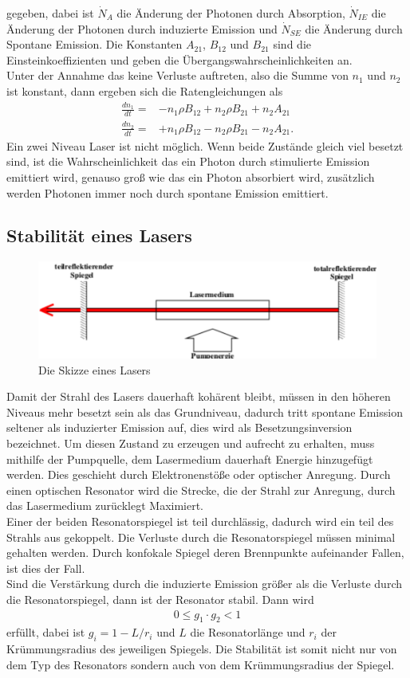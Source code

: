gegeben, dabei ist $\dot{N}_A$ die Änderung der Photonen durch Absorption, $\dot{N}_{IE}$ die Änderung der Photonen durch induzierte Emission und $\dot{N}_{SE}$ die Änderung durch Spontane Emission. Die Konstanten $A_{21}$, $B_{12}$ und $B_{21}$ sind die Einsteinkoeffizienten und geben die Übergangswahrscheinlichkeiten an.\\
Unter der Annahme das keine Verluste auftreten, also die Summe von $n_1$ und $n_2$ ist konstant, dann ergeben sich die Ratengleichungen als
\begin{align*}
\frac{dn_1}{dt}=&-n_1 \rho B_{12} + n_2\rho B_{21} + n_2 A_{21}\\
\frac{dn_2}{dt}=&+n_1\rho B_{12} - n_2\rho B_{21} -n_2A_{21}.
\end{align*}
Ein zwei Niveau Laser ist nicht möglich. Wenn beide Zustände gleich viel besetzt sind, ist die Wahrscheinlichkeit das ein Photon durch stimulierte Emission emittiert wird, genauso groß wie das ein Photon absorbiert wird, zusätzlich werden Photonen immer noch durch spontane Emission emittiert.
\subsection{Stabilität eines Lasers}
\begin{figure}[h!]
\centering
\includegraphics[scale=0.75]{../Grafiken/Laser.pdf}
\caption{Die Skizze eines Lasers\cite{V61}}\label{SkizzeLaser}
\end{figure}
Damit der Strahl des Lasers dauerhaft kohärent bleibt, müssen in den höheren Niveaus mehr besetzt sein als das Grundniveau, dadurch tritt spontane Emission seltener als induzierter Emission auf, dies wird als Besetzungsinversion bezeichnet. Um diesen Zustand zu erzeugen und aufrecht zu erhalten, muss mithilfe der Pumpquelle, dem Lasermedium dauerhaft Energie hinzugefügt werden. Dies geschieht durch Elektronenstöße oder optischer Anregung. Durch einen optischen Resonator wird die Strecke, die der Strahl zur Anregung, durch das Lasermedium zurücklegt Maximiert.\\
Einer der beiden Resonatorspiegel ist teil durchlässig, dadurch wird ein teil des Strahls aus gekoppelt. Die Verluste durch die Resonatorspiegel müssen minimal gehalten werden. Durch konfokale Spiegel deren Brennpunkte aufeinander Fallen, ist dies der Fall.\\
Sind die Verstärkung durch die induzierte Emission größer als die Verluste durch die Resonatorspiegel, dann ist der Resonator stabil. Dann wird
\begin{align}
0\le g_1\cdot g_2 < 1
\end{align}
erfüllt, dabei ist $g_i=1-L/r_i$ und $L$ die Resonatorlänge und $r_i$ der Krümmungsradius des jeweiligen Spiegels. Die Stabilität ist somit nicht nur von dem Typ des Resonators sondern auch von dem Krümmungsradius der Spiegel.
